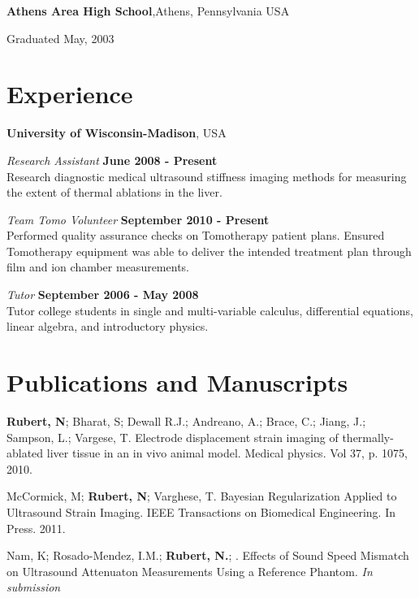 \documentclass[margin,line]{res}
\newenvironment{list1}{
  \begin{list}{\ding{113}}{%
      \setlength{\itemsep}{0in}
      \setlength{\parsep}{0in} \setlength{\parskip}{0in}
      \setlength{\topsep}{0in} \setlength{\partopsep}{0in}
      \setlength{\leftmargin}{0.17in}}}{\end{list}}
\begin{document}
\begin{resume}
{\bf Athens Area High School},Athens, Pennsylvania USA\\
\vspace*{-.1in}
\begin{list1}
\item[] Graduated May, 2003
\end{list1}

\section{\sc Experience}

{\bf University of Wisconsin-Madison}, USA

\vspace{-.3cm}
{\em Research Assistant} \hfill {\bf June 2008 - Present} \\
Research diagnostic medical ultrasound stiffness imaging methods for measuring the extent of thermal ablations in the liver.

\vspace{-.3cm}
{\em Team Tomo Volunteer} \hfill {\bf September 2010 - Present} \\
Performed quality assurance checks on Tomotherapy patient plans.  Ensured Tomotherapy equipment was able to deliver the intended 
treatment plan through film and ion chamber measurements.

\vspace{-.3cm}
{\em Tutor} \hfill {\bf September 2006 - May 2008} \\
Tutor college students in single and multi-variable calculus, differential equations, linear algebra, and introductory physics.



\section{\sc Publications and Manuscripts}

{\bf Rubert, N}; Bharat, S; Dewall R.J.; Andreano, A.; Brace, C.; Jiang, J.; Sampson, L.; Vargese, T.  Electrode displacement strain imaging of thermally-ablated liver tissue in an in vivo animal model.  Medical physics. Vol 37, p. 1075, 2010.

McCormick, M; {\bf Rubert, N}; Varghese, T. Bayesian Regularization Applied to
Ultrasound Strain Imaging. IEEE Transactions on Biomedical Engineering.
In Press. 2011.

Nam, K; Rosado-Mendez, I.M.; {\bf Rubert, N.}; .  Effects of Sound Speed Mismatch on Ultrasound Attenuaton Measurements Using a Reference Phantom.  	{\it In submission}


\end{resume}
\end{document}

